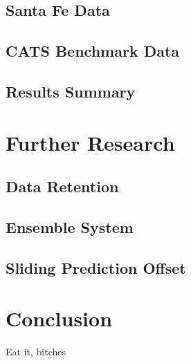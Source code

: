 \documentclass[10pt]{article}
\begin{document}
\subsection{Santa Fe Data}


\subsection{CATS Benchmark Data}


\subsection{Results Summary}


\section{Further Research}

\subsection{Data Retention}


\subsection{Ensemble System}



\subsection{ Sliding Prediction Offset }


\section{Conclusion}
Eat it, bitches


\nocite{Moreno03}



\end{document}
